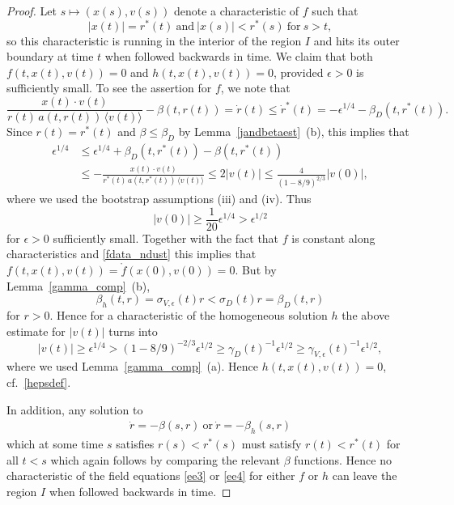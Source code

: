 \documentclass[11pt]{article}
\begin{document}
\begin{proof}
  Let
  $s\mapsto (x(s),v(s))$ denote a characteristic of $f$
  such that
  \[
  |x(t)| = r^\ast(t)\ \mbox{and}\ |x(s)| < r^\ast(s)\ \mbox{for}\ s>t,
  \]
  so this characteristic is running in the
  interior of the region $I$ and hits its outer boundary
  at time $t$ when followed backwards in time.
  We claim that both $f(t,x(t),v(t))=0$ and
  $h(t,x(t),v(t))=0$, provided $\epsilon>0$ is sufficiently small.
  To see the assertion for $f$, we note that
  \[
  \frac{x(t)\cdot v(t)}{r(t)\, a(t,r(t))\, \langle v(t)\rangle} - \beta(t,r(t))
  = \dot r(t) \leq \dot r^\ast(t) = - \epsilon^{1/4} - \beta_D(t,r^\ast(t)).
  \]
  Since $r(t)=r^\ast(t)$ and $\beta\leq \beta_D$ by
  Lemma~\ref{jandbetaest}~(b), this implies that
  \begin{align*}
    \epsilon^{1/4}
    &\leq
    \epsilon^{1/4} + \beta_D(t,r^\ast(t)) - \beta(t,r^\ast(t))\\
    &\leq
    - \frac{x(t)\cdot v(t)}{r^\ast(t)\, a(t,r^\ast(t))\, \langle v(t)\rangle}
    \leq 2 |v(t)|
    \leq \frac{4}{(1-8/9)^{2/3}} |v(0)|,
  \end{align*}
  where we used the bootstrap assumptions (iii) and (iv). Thus
  \[
  |v(0)| \geq \frac{1}{20} \epsilon^{1/4} > \epsilon^{1/2}
  \]
  for $\epsilon>0$ sufficiently small. Together with the fact that $f$
  is constant along characteristics and \eqref{fdata_ndust} this implies that
  $f(t,x(t),v(t))=\mathring{f}(x(0),v(0)) =0$.
  But by Lemma~\ref{gamma_comp}~(b),
  \[
  \beta_h(t,r)=\sigma_{V,\epsilon}(t) r < \sigma_{D}(t) r =\beta_D(t,r)
  \]
  for $r>0$. Hence for a characteristic of the homogeneous solution
  $h$ the above estimate for $|v(t)|$ turns into
  \[
  |v(t)| \geq  \epsilon^{1/4} >
  (1-8/9)^{-2/3} \epsilon^{1/2} \geq \gamma_D(t)^{-1}  \epsilon^{1/2}
  \geq \gamma_{V,\epsilon}(t)^{-1} \epsilon^{1/2},
  \]
  where we used Lemma~\ref{gamma_comp}~(a).
  Hence $h(t,x(t),v(t))=0$, cf.~\eqref{hepsdef}.

  In addition, any solution to
  \begin{align}\label{charbeta_fh}
  \dot r = - \beta(s,r) \ \mbox{or}\ \dot r = - \beta_h(s,r)
  \end{align}
  which at some time $s$ satisfies $r(s) < r^\ast (s)$ must satisfy
  $r(t) < r^\ast (t)$ for all $t < s$ which again follows by comparing the
  relevant $\beta$ functions. Hence no characteristic
  of the field equations \eqref{ee3} or \eqref{ee4} for either $f$ or $h$
  can leave the region $I$ when followed backwards in time.


\end{proof}
\end{document}
